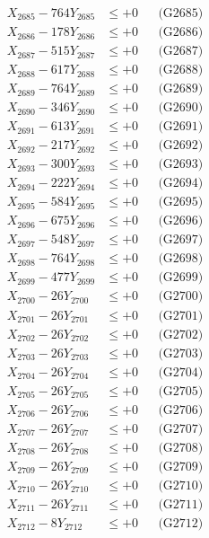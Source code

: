 \documentclass[a4paper,10pt]{article}
\begin{document}
{\begin{align}
X_{2685} - 764Y_{2685} &\leq +0 && \text{(G2685)} \\
X_{2686} - 178Y_{2686} &\leq +0 && \text{(G2686)} \\
X_{2687} - 515Y_{2687} &\leq +0 && \text{(G2687)} \\
X_{2688} - 617Y_{2688} &\leq +0 && \text{(G2688)} \\
X_{2689} - 764Y_{2689} &\leq +0 && \text{(G2689)} \\
X_{2690} - 346Y_{2690} &\leq +0 && \text{(G2690)} \\
\allowbreak
X_{2691} - 613Y_{2691} &\leq +0 && \text{(G2691)} \\
X_{2692} - 217Y_{2692} &\leq +0 && \text{(G2692)} \\
X_{2693} - 300Y_{2693} &\leq +0 && \text{(G2693)} \\
X_{2694} - 222Y_{2694} &\leq +0 && \text{(G2694)} \\
X_{2695} - 584Y_{2695} &\leq +0 && \text{(G2695)} \\
X_{2696} - 675Y_{2696} &\leq +0 && \text{(G2696)} \\
X_{2697} - 548Y_{2697} &\leq +0 && \text{(G2697)} \\
X_{2698} - 764Y_{2698} &\leq +0 && \text{(G2698)} \\
X_{2699} - 477Y_{2699} &\leq +0 && \text{(G2699)} \\
X_{2700} - 26Y_{2700} &\leq +0 && \text{(G2700)} \\
\allowbreak
X_{2701} - 26Y_{2701} &\leq +0 && \text{(G2701)} \\
X_{2702} - 26Y_{2702} &\leq +0 && \text{(G2702)} \\
X_{2703} - 26Y_{2703} &\leq +0 && \text{(G2703)} \\
X_{2704} - 26Y_{2704} &\leq +0 && \text{(G2704)} \\
X_{2705} - 26Y_{2705} &\leq +0 && \text{(G2705)} \\
X_{2706} - 26Y_{2706} &\leq +0 && \text{(G2706)} \\
X_{2707} - 26Y_{2707} &\leq +0 && \text{(G2707)} \\
X_{2708} - 26Y_{2708} &\leq +0 && \text{(G2708)} \\
X_{2709} - 26Y_{2709} &\leq +0 && \text{(G2709)} \\
X_{2710} - 26Y_{2710} &\leq +0 && \text{(G2710)} \\
\allowbreak
X_{2711} - 26Y_{2711} &\leq +0 && \text{(G2711)} \\
X_{2712} - 8Y_{2712} &\leq +0 && \text{(G2712)} \\

\end{align}}
\end{document}
